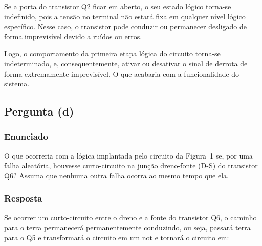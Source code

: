 \documentclass[12pt]{article}
\begin{document}
Se a porta do transistor Q2 ficar em aberto, o seu estado lógico torna-se
indefinido, pois a tensão no terminal não estará fixa em qualquer nível lógico específico. Nesse caso, o transistor pode conduzir ou permanecer desligado de forma
imprevisível devido a ruídos ou erros.

Logo, o comportamento da primeira etapa lógica do circuito
torna-se indeterminado, e, consequentemente, ativar ou desativar o sinal de derrota
de forma extremamente imprevisível. O que acabaria com a funcionalidade do sistema.

\subsection{Pergunta (d)}

\subsubsection*{Enunciado}

O que ocorreria com a lógica implantada pelo circuito da Figura~1 se,
por uma falha aleatória, houvesse curto-circuito na junção dreno-fonte
(D-S) do transistor Q6? Assuma que nenhuma outra falha ocorra ao mesmo
tempo que ela.

\subsubsection*{Resposta}

Se ocorrer um curto-circuito entre o dreno e a fonte do transistor Q6, o caminho para o terra permanecerá permanentemente conduzindo, ou seja, passará terra para o Q5 e transformará o circuito em um not e tornará o circuito em:

\begin{center}
\end{center}
\end{document}
